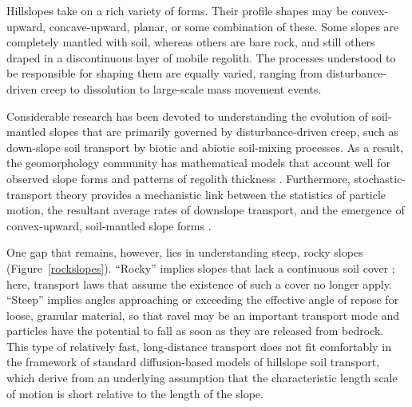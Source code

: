 \documentclass[esurf, manuscript]{copernicus}
\begin{document}
\introduction  %

Hillslopes take on a rich variety of forms. Their profile shapes may be convex-upward, concave-upward, planar, or some combination of these. Some slopes are completely mantled with soil, whereas others are bare rock, and still others draped in a discontinuous layer of mobile regolith. The processes understood to be responsible for shaping them are equally varied, ranging from disturbance-driven creep to dissolution to large-scale mass movement events.

Considerable research has been devoted to understanding the evolution of soil-mantled slopes that are primarily governed by disturbance-driven creep, such as down-slope soil transport by biotic and abiotic soil-mixing processes. As a result, the geomorphology community has mathematical models that account well for observed slope forms and patterns of regolith thickness \citep[e.g.,][]{roering2008well}. Furthermore, stochastic-transport theory provides a mechanistic link between the statistics of particle motion, the resultant average rates of downslope transport, and the emergence of convex-upward, soil-mantled slope forms \citep{culling1963soil,roering2004soil,foufoula2010nonlocal,furbish2009statistical,furbish2010divots,tucker2010trouble}.

One gap that remains, however, lies in understanding steep, rocky slopes (Figure~\ref{rockslopes}). ``Rocky'' implies slopes that lack a continuous soil cover \citep[e.g.,][and references therein]{howard1994rock}; here, transport laws that assume the existence of such a cover no longer apply. ``Steep'' implies angles approaching or exceeding the effective angle of repose for loose, granular material, so that ravel may be an important transport mode %
\citep[e.g.,][]{gabet2003sediment,roering2005fire,lamb2011model,gabet2012particle} and particles have the potential to fall as soon as they are released from bedrock. This type of relatively fast, long-distance transport does not fit comfortably in the framework of standard diffusion-based models of hillslope soil transport, which derive from an underlying assumption that the characteristic length scale of motion is short relative to the length of the slope.
\end{document}
